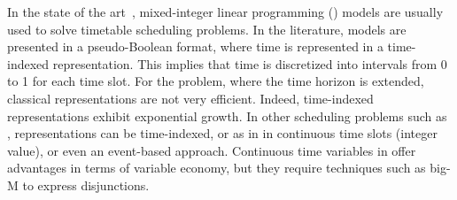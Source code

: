
%
In the state of the art~\cite{2014_sorensen_cor,2014_sorensen_JOS}, mixed-integer linear programming (\MIP{}) models are usually used to solve timetable scheduling problems. 
In the literature, \MIP{} models are presented in a pseudo-Boolean format, where time is represented in a time-indexed representation. 
This implies that time is discretized into intervals from 0 to 1 for each time slot. 
%
For the \UTP{} problem, where the time horizon is extended, classical representations are not very efficient. 
Indeed, time-indexed representations exhibit exponential growth. 
In other scheduling problems such as \RCPCSP{}, representations can be time-indexed, or as in \CP{} in continuous time slots (integer value), or even an event-based approach. 
%
Continuous time variables in \MIP{} offer advantages in terms of variable economy, but they require techniques such as big-M to express disjunctions. %
